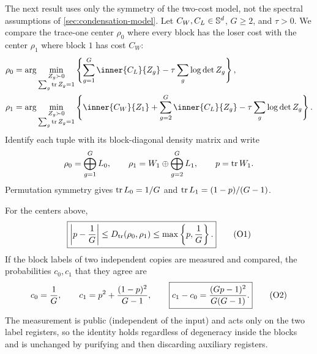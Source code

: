 The next result uses only the symmetry of the two-cost model, not the
spectral assumptions of \cref{sec:condensation-model}.  Let
$C_W,C_L\in\mathbb{S}^d$, $G\ge2$, and $\tau>0$.  We compare the trace-one center
$\rho_0$ where every block has the loser cost with the center $\rho_1$ where
block $1$ has cost $C_W$:
\begin{align}
 \rho_0&=\arg\min_{\substack{Z_g\succ0\\\sum_g\tr Z_g=1}}
 \left\{\sum_{g=1}^G\inner{C_L}{Z_g}-\tau\sum_g\log\det Z_g\right\},
                                                               \label{eq:cond-rho-zero}\\
 \rho_1&=\arg\min_{\substack{Z_g\succ0\\\sum_g\tr Z_g=1}}
 \left\{\inner{C_W}{Z_1}+\sum_{g=2}^G\inner{C_L}{Z_g}
       -\tau\sum_g\log\det Z_g\right\}.                 \label{eq:cond-rho-one}
\end{align}
Identify each tuple with its block-diagonal density matrix and write
\begin{equation}
 \rho_0=\bigoplus_{g=1}^G L_0,\qquad
 \rho_1=W_1\oplus\bigoplus_{g=2}^G L_1,\qquad p=\operatorname{tr} W_1.
 \label{eq:cond-rho-blocks}
\end{equation}
Permutation symmetry gives $\operatorname{tr} L_0=1/G$ and
$\operatorname{tr} L_1=(1-p)/(G-1)$.

\begin{theorem}
\label{thm:cond-visibility}
For the centers above,
\begin{equation*}
 \boxed{\left|p-\frac1G\right|
 \le\Dtr(\rho_0,\rho_1)\le\max\left\{p,\frac1G\right\}.}
 \condtag{O1}\label{eq:cond-visibility}
\end{equation*}
If the block labels of two independent copies are measured and compared,
the probabilities $c_0,c_1$ that they agree are
\begin{equation*}
 c_0=\frac1G,\qquad
 c_1=p^2+\frac{(1-p)^2}{G-1},\qquad
 \boxed{c_1-c_0=\frac{(Gp-1)^2}{G(G-1)}.}
 \condtag{O2}\label{eq:cond-collision}
\end{equation*}
The measurement is public (independent of the input) and acts only on the
two label registers, so the identity holds regardless of degeneracy inside
the blocks and is unchanged by purifying and then discarding auxiliary
registers.
\end{theorem}

